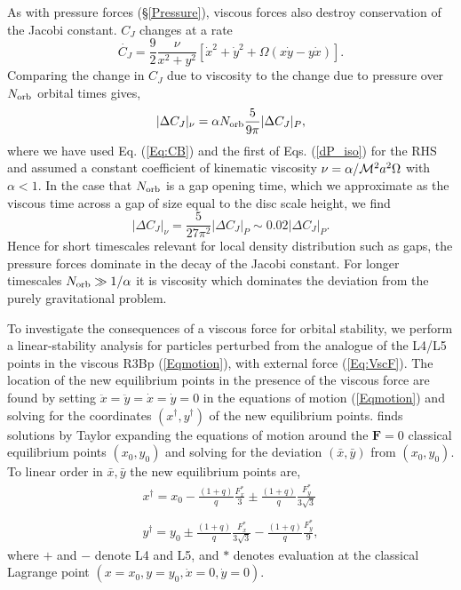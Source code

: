 As with pressure forces (\S \ref{Pressure}), viscous forces also destroy conservation of
the Jacobi constant. $C_J$ changes at a rate
\begin{equation}
\dot{C_J} = \frac{9}{2} \frac{\nu}{x^2+y^2} \left[ \dot{x}^2  + \dot{y}^2 + \Omega (x\dot{y} - y \dot{x}) \right].
\end{equation}
Comparing the change in $C_J$ due to viscosity to the change due to
pressure over $N_{\rm orb}$ orbital times gives,
\begin{equation}
|\Delta C_J |_{\nu} = \alpha N_{\rm orb} \frac{5}{9 \pi} |\Delta C_J |_{P},
\end{equation}
where we have used Eq. (\ref{Eq:CB}) and the first of
Eqs. (\ref{dP_iso}) for the RHS and assumed a constant coefficient of
kinematic viscosity $\nu = \alpha/\mathcal{M}^2 a^2 \Omega$ with $\alpha <
1$. In the case that $N_{\rm orb}$ is a gap opening time, which we
approximate as the viscous time across a gap of size equal to the disc
scale height, we find
\begin{equation}
|\Delta C_J |_{\nu} = \frac{5}{27 \pi^2} |\Delta C_J |_{P} \sim  0.02 |\Delta C_J |_{P}.
\end{equation}
Hence for short timescales relevant for local density distribution
such as gaps, the pressure forces dominate in the decay of the Jacobi
constant. For longer timescales $N_{\rm orb} \gg 1/\alpha$ it is viscosity which dominates
the deviation from the purely gravitational problem.
 

To investigate the consequences of a viscous force for orbital
stability, we perform a linear-stability analysis for particles
perturbed from the analogue of the L4/L5 points in the viscous R3Bp
(\ref{Eqmotion}), with external force (\ref{Eq:VscF}). The location of
the new equilibrium points in the presence of the viscous force are
found by setting $\ddot{x} = \ddot{y} = \dot{x} = \dot{y} =0$ in the
equations of motion (\ref{Eqmotion}) and solving for the coordinates
$(x^{\dagger},y^{\dagger})$ of the new equilibrium
points. \cite{Murray:1994} finds solutions by Taylor expanding the
equations of motion around the $\mathbf{F}=0$ classical equilibrium
points $(x_0,y_0)$ and solving for the deviation $(\bar{x},\bar{y})$
from $(x_0,y_0)$. To linear order in $\bar{x},\bar{y}$ the new
equilibrium points are,
\begin{equation}
\begin{array}{l}
x^\dagger = x_0 - \frac{(1+q)}{q} \frac{F^*_x}{3 } \pm  \frac{(1+q)}{q} \frac{F^*_y}{3\sqrt3 } \nonumber \\ \nonumber \\ 
y^\dagger = y_0 \pm \frac{(1+q)}{q} \frac{F^*_x}{3\sqrt3 } -  \frac{(1+q)}{q} \frac{F^*_y}{9 }, 
\label{xyDag}
\end{array}
\end{equation}
where $+$ and $-$ denote L4 and L5, and $*$ denotes evaluation at the
classical Lagrange point $(x=x_0, y=y_0, \dot{x}=0, \dot{y}=0)$.


